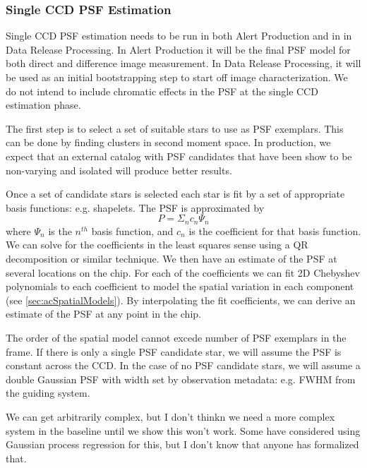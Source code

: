 \subsubsection{Single CCD PSF Estimation}
\label{sec:acSingleCCDPSF}

Single CCD PSF estimation needs to be run in both Alert Production and in in Data Release Processing.  In Alert Production it will be the final PSF model for both direct and difference image measurement.  In Data Release Processing, it will be used as an initial bootstrapping step to start off image characterization.  We do not intend to include chromatic effects in the PSF at the single CCD estimation phase.

The first step is to select a set of suitable stars to use as PSF exemplars.  This can be done by finding clusters in second moment space.  In production, we expect that an external catalog with PSF candidates that have been show to be non-varying and isolated will produce better results.

Once a set of candidate stars is selected each star is fit by a set of appropriate basis functions: e.g. shapelets.  The PSF is approximated by
\[
P = \Sigma_n c_n\Psi_n
\]
where $\Psi_n$ is the $n^{th}$ basis function, and $c_n$ is the coefficient for that basis function.  We can solve for the coefficients in the least squares sense using a QR decomposition or similar technique.  We then have an estimate of the PSF at several locations on the chip.  For each of the coefficients we can fit 2D Chebyshev polynomials to each coefficient to model the spatial variation in each component (see \ref{sec:acSpatialModels}).  By interpolating the fit coefficients, we can derive an estimate of the PSF at any point in the chip.

The order of the spatial model cannot excede number of PSF exemplars in the frame.  If there is only a single PSF candidate star, we will assume the PSF is constant across the CCD.  In the case of no PSF candidate stars, we will assume a double Gaussian PSF with width set by observation metadata: e.g. FWHM from the guiding system.

\begin{note}
We can get arbitrarily complex, but I don't thinkn we need a more complex system in the baseline until we show this won't work.  Some have considered using Gaussian process regression for this, but I don't know that anyone has formalized that.
\end{note}

